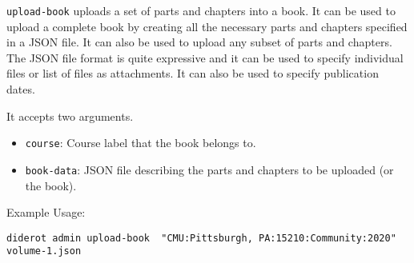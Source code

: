\begin{gram}
\verb|upload-book| uploads a set of parts and chapters into a book.
%
It can be used to upload a complete book by creating all
the necessary parts and chapters specified in a JSON file.
%
It can also be used to upload any subset of parts and chapters.
%
The JSON file format is quite expressive and it can be used to specify individual files or list of files as attachments.
%
It can also be used to specify publication dates.

It accepts two arguments.
%
\begin{itemize}
  \item \verb|course|: Course label that the book belongs to.
  \item \verb|book-data|: JSON file describing the parts and chapters to be uploaded (or the book).
\end{itemize}
\end{gram}

Example Usage:
\begin{verbatim}
diderot admin upload-book  "CMU:Pittsburgh, PA:15210:Community:2020" volume-1.json
\end{verbatim}
%
 
